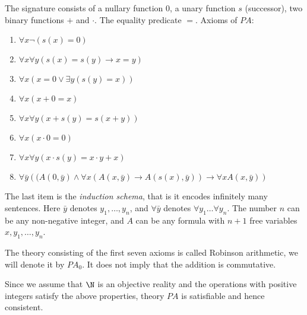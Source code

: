 

\setcounter{section}{3}
\setcounter{subsection}{3}
\setcounter{dfn}{24}

The signature consists of a nullary function $0$, a unary function $s$ (successor), two binary functions $+$ and $\cdot$.
The equality predicate $=$.
Axioms of $PA$:
\begin{enumerate}
\item
$\forall x \neg(s(x) = 0)$
\item
$\forall x \forall y (s(x)=s(y) \to x=y)$
\item
$\forall x (x = 0 \vee \exists y (s(y)=x))$
\item
$\forall x (x+0=x)$
\item
$\forall x \forall y (x+s(y) = s(x+y))$
\item
$\forall x (x \cdot 0 = 0)$
\item
$\forall x \forall y (x \cdot s(y) = x \cdot y + x)$
\item
$\forall \bar y \left((A(0, \bar y) \wedge \forall x (A(x, \bar y) \to A(s(x), \bar y)) \to \forall x A(x, \bar y)\right)$
\end{enumerate}
The last item is the \emph{induction schema}, that is it encodes infinitely many sentences.
Here $\bar y$ denotes $y_1, \ldots, y_n$, and $\forall \bar y$ denotes $\forall y_1 \ldots \forall y_n$.
The number $n$ can be any non-negative integer, and $A$ can be any formula with $n+1$ free variables $x, y_1, \ldots, y_n$.


The theory consisting of the first seven axioms is called Robinson arithmetic, we will denote it by $PA_0$.
It does not imply that the addition is commutative.

Since we assume that $\N$ is an objective reality and the operations with positive integers satisfy the above properties,
theory $PA$ is satisfiable and hence consistent.







